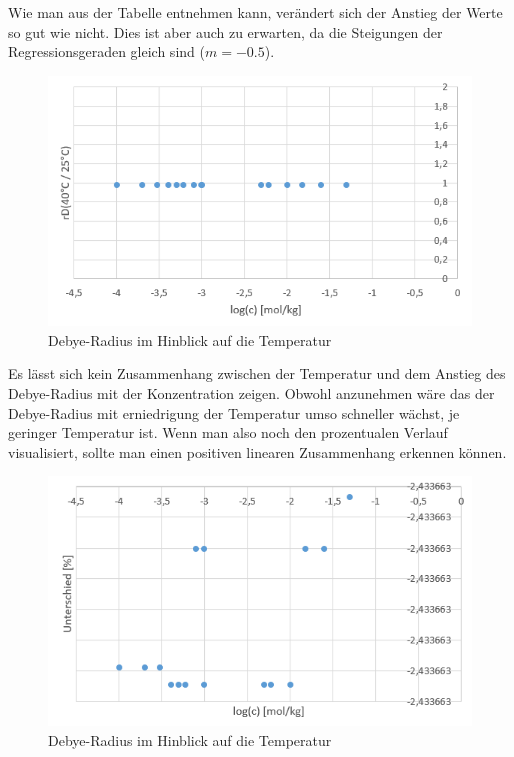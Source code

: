 

Wie man aus der Tabelle entnehmen kann, verändert sich der Anstieg der Werte so gut wie nicht. Dies ist aber auch zu
erwarten, da die Steigungen der Regressionsgeraden gleich sind ($m = -0.5$).

\begin{figure}[H]
    \centering
    \includegraphics[scale=.7]{../src/img/graph1_vergleich.png}
    \caption{Debye-Radius im Hinblick auf die Temperatur}
\end{figure}

Es lässt sich kein Zusammenhang zwischen der Temperatur und dem Anstieg des Debye-Radius mit der Konzentration zeigen. Obwohl anzunehmen wäre
das der Debye-Radius mit erniedrigung der Temperatur umso schneller wächst, je geringer Temperatur ist. Wenn man also noch den prozentualen
Verlauf visualisiert, sollte man einen  positiven linearen Zusammenhang erkennen können.

\begin{figure}[H]
    \centering
    \includegraphics[scale=.7]{../src/img/graph2_vergleich.png}
    \caption{Debye-Radius im Hinblick auf die Temperatur}
\end{figure}

